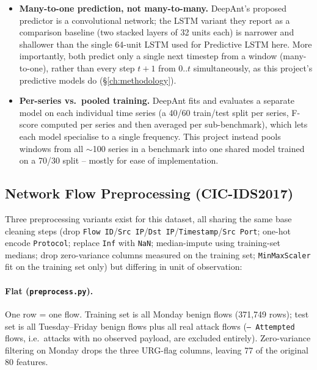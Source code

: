 \begin{itemize}
  \item \textbf{Many-to-one prediction, not many-to-many.} DeepAnt's proposed predictor is a convolutional network; the LSTM variant they report as a comparison baseline (two stacked layers of 32 units each) is narrower and shallower than the single 64-unit LSTM used for Predictive LSTM here. More importantly, both predict only a single next timestep from a window (many-to-one), rather than every step $t{+}1$ from $0..t$ simultaneously, as this project's predictive models do (\S\ref{ch:methodology}).
  \item \textbf{Per-series vs.\ pooled training.} DeepAnt fits and evaluates a separate model on each individual time series (a 40/60 train/test split per series, F-score computed per series and then averaged per sub-benchmark), which lets each model specialise to a single frequency. This project instead pools windows from all $\sim$100 series in a benchmark into one shared model trained on a 70/30 split -- mostly for ease of implementation.
\end{itemize}

\subsection{Network Flow Preprocessing (CIC-IDS2017)}

Three preprocessing variants exist for this dataset, all sharing the same base cleaning steps (drop \texttt{Flow ID}/\texttt{Src IP}/\texttt{Dst IP}/\texttt{Timestamp}/\texttt{Src Port}; one-hot encode \texttt{Protocol}; replace \texttt{Inf} with \texttt{NaN}; median-impute using training-set medians; drop zero-variance columns measured on the training set; \texttt{MinMaxScaler} fit on the training set only) but differing in unit of observation:

\paragraph{Flat (\texttt{preprocess.py}).} One row = one flow. Training set is all Monday benign flows (371{,}749 rows); test set is all Tuesday--Friday benign flows plus all real attack flows (\texttt{-- Attempted} flows, i.e.\ attacks with no observed payload, are excluded entirely). Zero-variance filtering on Monday drops the three URG-flag columns, leaving 77 of the original 80 features.

